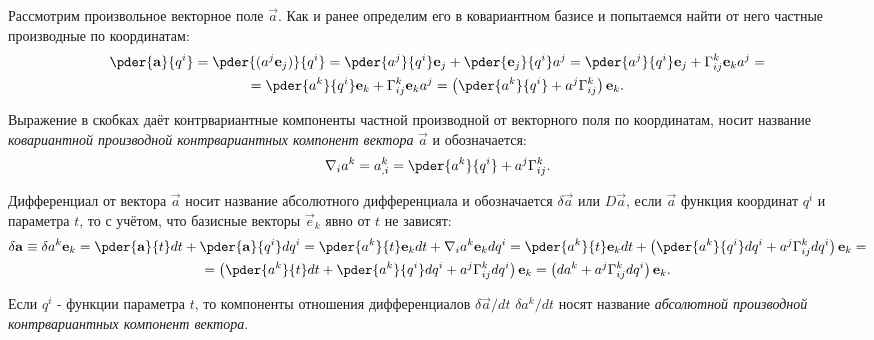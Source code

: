 
Рассмотрим произвольное векторное поле \( \vec{a} \). Как и ранее определим его
в ковариантном базисе и попытаемся найти от него частные производные по
координатам:
\begin{gather*}
    \pder{\vec{a}}{q^i} = 
    \pder{(a^j \vec{e}_{j})}{q^i} = 
    \pder{a^j}{q^i}\vec{e}_{j} + \pder{ \vec{e}_{j}}{q^i} a^j =
    \pder{a^j}{q^i}\vec{e}_{j} + \Gamma^k_{ij} \vec{e}_{k} a^j =\\=
    \pder{a^k}{q^i}\vec{e}_{k} + \Gamma^k_{ij} \vec{e}_{k} a^j =
    \left(\pder{a^k}{q^i} + a^j \Gamma^k_{ij}\right)\vec{e}_{k}.
\end{gather*}

Выражение в скобках даёт контрвариантные компоненты частной производной от
векторного поля по координатам, носит название \emph{ковариантной производной
контрвариантных компонент вектора } \( \vec{a} \) и обозначается:
\[
    \nabla_i a^k = a^k_{,i} = \pder{a^k}{q^i} + a^j \Gamma^k_{ij}.
\]
    
Дифференциал от вектора \( \vec{a} \) носит название абсолютного дифференциала
и обозначается \( \delta  \vec{a} \) или \( D  \vec{a} \), если \( \vec{a} \)
функция координат \( q^i \) и параметра \( t \), то с учётом, что базисные
векторы \( \vec{e}_{k} \) явно от \( t \) не зависят:
\begin{gather*}
    \delta  \vec{a} \equiv \delta a^k \vec{e}_{k}= 
    \pder{\vec{a}}{t} dt + \pder{ \vec{a}}{q^i} dq^i = 
    \pder{a^k}{t} \vec{e}_{k} dt  + \nabla_i a^k \vec{e}_{k} dq^i =
    \pder{a^k}{t}\vec{e}_{k} dt  + \left(\pder{a^k}{q^i}dq^i +
    a^j \Gamma^k_{ij} dq^i\right) \vec{e}_{k} = \\ =
    \left(\pder{a^k}{t} dt+\pder{a^k}{q^i}dq^i +
    a^j \Gamma^k_{ij} dq^i\right) \vec{e}_{k} = 
    \left(d{a^k} + a^j \Gamma^k_{ij} dq^i\right) \vec{e}_{k}.
\end{gather*}
    
Если \( q^i \) - функции параметра \( t \), то компоненты отношения
дифференциалов \( \delta\vec{a}/dt \) \( \delta a^k/dt \) носят название
\emph{абсолютной производной контрвариантных компонент вектора}.

\newpage
